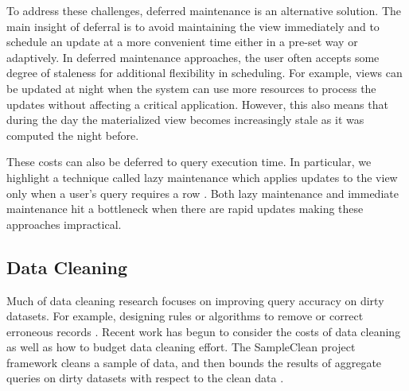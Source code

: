 To address these challenges, deferred maintenance is an alternative solution.
The main insight of deferral is to avoid maintaining the view immediately and to schedule an update at a more convenient time either in a pre-set way or adaptively.
In deferred maintenance approaches, the user often accepts some degree of staleness for additional flexibility in scheduling.
For example, views can be updated at night when the system can use more resources to process the updates without affecting a critical application.
However, this also means that during the day the materialized view becomes increasingly stale as it was computed the night before.

These costs can also be deferred to query execution time.
In particular, we highlight a technique called lazy maintenance which applies updates to the view only when a user's query requires a row \cite{zhou2007lazy}.
Both lazy maintenance and immediate maintenance hit a bottleneck when there are rapid updates making these approaches impractical.







\subsection{Data Cleaning}
Much of data cleaning research focuses on improving query accuracy on dirty datasets.
For example, designing rules or algorithms to remove or correct erroneous records \cite{rahm2000data}.
Recent work has begun to consider the costs of data cleaning as well as how to budget data cleaning effort.
The SampleClean project framework cleans a sample of data, and then bounds the results of aggregate queries on dirty datasets with respect to the clean data \cite{wang1999sample}.

